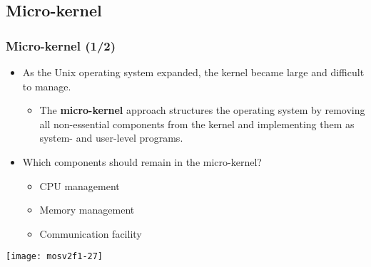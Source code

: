 \documentclass[CJKutf8,xcolor=pdftex,dvipsnames,table]{beamer}
\begin{document}
\begin{CJK*}{UTF8}{song}
  \subsection{Micro-kernel}

  \begin{frame}
    \frametitle{Micro-kernel (1/2)} \pause
    \begin{itemize}
    \item{As the Unix operating system expanded, the kernel became large and difficult to manage.} \pause
      \begin{itemize}
      \item{The \textbf{micro-kernel} approach structures the operating system by removing all non-essential components from the kernel and implementing them as system- and user-level programs.} \pause
      \end{itemize}
    \item{Which components should remain in the micro-kernel?} \pause
      \begin{itemize}
      \item{CPU management} \pause
      \item{Memory management} \pause
      \item{Communication facility} \pause
      \end{itemize}
    \end{itemize}
    \begin{center}
      \texttt{[image: mosv2f1-27]}
    \end{center}
  \end{frame}
  

\end{CJK*}
\end{document}
